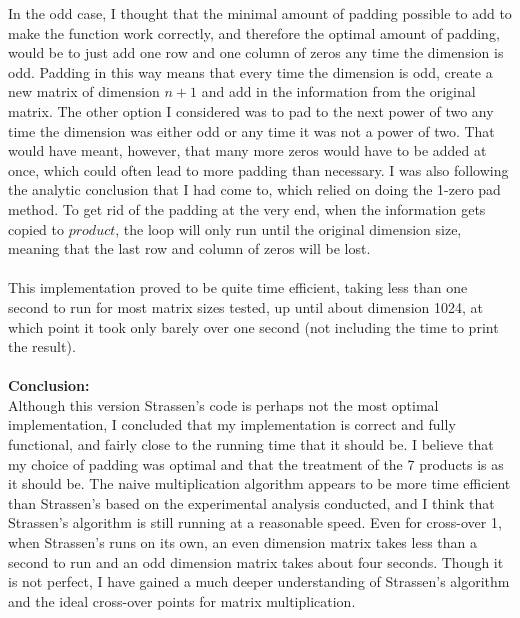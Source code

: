 \documentclass[11pt]{article}
\begin{document}
In the odd case, I thought that the minimal amount of padding possible to add to make the function work correctly, and therefore the optimal amount of padding, would be to just add one row and one column of zeros any time the dimension is odd. Padding in this way means that every time the dimension is odd, create a new matrix of dimension $n + 1$ and add in the information from the original matrix. The other option I considered was to pad to the next power of two any time the dimension was either odd or any time it was not a power of two. That would have meant, however, that many more zeros would have to be added at once, which could often lead to more padding than necessary. I was also following the analytic conclusion that I had come to, which relied on doing the 1-zero pad method. To get rid of the padding at the very end, when the information gets copied to $product$, the loop will only run until the original dimension size, meaning that the last row and column of zeros will be lost. \\\\
This implementation proved to be quite time efficient, taking less than one second to run for most matrix sizes tested, up until about dimension 1024, at which point it took only barely over one second (not including the time to print the result). \\\\ 

\textbf{Conclusion:} \\
Although this version Strassen's code is perhaps not the most optimal implementation, I concluded that my implementation is correct and fully functional, and fairly close to the running time that it should be. I believe that my choice of padding was optimal and that the treatment of the 7 products is as it should be. The naive multiplication algorithm appears to be more time efficient than Strassen's based on the experimental analysis conducted, and I think that Strassen's algorithm is still running at a reasonable speed. Even for cross-over 1, when Strassen's runs on its own, an even dimension matrix takes less than a second to run and an odd dimension matrix takes about four seconds. Though it is not perfect, I have gained a much deeper understanding of Strassen's algorithm and the ideal cross-over points for matrix multiplication.
\end{document}
